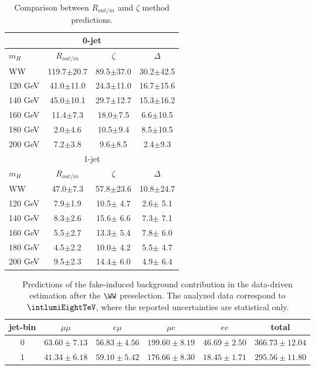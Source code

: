 \begin{table}
{%
 \begin{center}
 \begin{tabular}{l | c c | c }
\hline
\multicolumn{4}{c}{0-jet} \\
 \hline
 $m_H$ & $R_{out/in}$ & $\zeta$ & $\Delta$ \\
 \hline
         WW & 119.7$\pm$20.7 & 89.5$\pm$37.0 & 30.2$\pm$42.5 \\
    120 GeV &  41.0$\pm$11.0 & 24.3$\pm$11.0 & 16.7$\pm$15.6 \\
    140 GeV &  45.0$\pm$10.1 & 29.7$\pm$12.7 & 15.3$\pm$16.2 \\
    160 GeV &  11.4$\pm$7.3  & 18.0$\pm$7.5  &  6.6$\pm$10.5 \\
    180 GeV &   2.0$\pm$4.6  & 10.5$\pm$9.4  &  8.5$\pm$10.5 \\
    200 GeV &   7.2$\pm$3.8  &  9.6$\pm$8.5  &  2.4$\pm$9.3  \\
 \hline
 \hline
\multicolumn{4}{c}{1-jet} \\
 \hline
 $m_H$ & $R_{out/in}$ & $\zeta$ & $\Delta$ \\
 \hline
         WW & 47.0$\pm$7.3 & 57.8$\pm$23.6 & 10.8$\pm$24.7 \\
    120 GeV &  7.9$\pm$1.9 & 10.5$\pm$ 4.7 &  2.6$\pm$ 5.1 \\
    140 GeV &  8.3$\pm$2.6 & 15.6$\pm$ 6.6 &  7.3$\pm$ 7.1 \\
    160 GeV &  5.5$\pm$2.7 & 13.3$\pm$ 5.4 &  7.8$\pm$ 6.0 \\
    180 GeV &  4.5$\pm$2.2 & 10.0$\pm$ 4.2 &  5.5$\pm$ 4.7 \\
    200 GeV &  9.5$\pm$2.3 & 14.4$\pm$ 6.0 &  4.9$\pm$ 6.4 \\
 \hline
\end{tabular}
\end{center}
}
\caption{Comparison between $R_{out/in}$ amd $\zeta$ method predictions.}
\label{tab:dy_zeta}
\end{table}

\begin{table}[ht!]
\begin{center}
\begin{tabular}{c c c c c c} 
\hline
jet-bin &	 $\mu\mu$ &	 $e \mu$ &	 $\mu e$ &	 $ee$ &	 total \\ 
\hline
0 &  $63.60 \pm  7.13$   &  $56.83 \pm  4.56$	  &  $199.60 \pm  8.19$  & $46.69 \pm  2.50$  & $366.73 \pm 12.04$ \\
1 &  $41.34 \pm  6.18$   &  $59.10 \pm  5.42$	  &  $176.66 \pm  8.30$  & $18.45 \pm  1.71$  & $295.56 \pm 11.80$ \\ 
\hline
\end{tabular}
\caption{Predictions of the fake-induced background contribution 
in the data-driven estimation after the $\WW$ preselection. 
The analyzed data correspond to $\intlumiEightTeV$, where the reported uncertainties are statistical only.}
\label{tab:fake_est}
\end{center}
\end{table}

